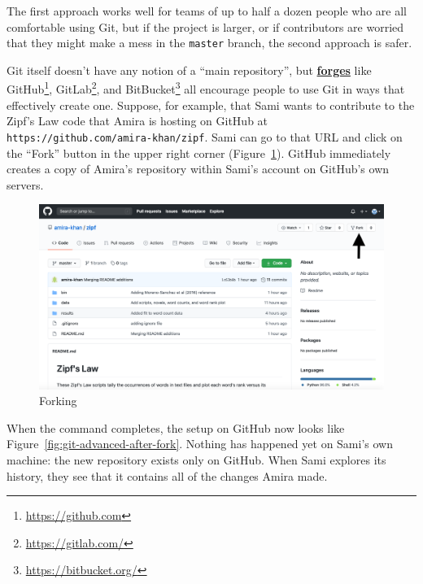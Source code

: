 \documentclass[
]{krantz}
\renewcommand{\href}[2]{#2\footnote{\url{#1}}}
\newcommand{\gref}[2]{\hyperlink{#2}{\textbf{#1}}}
\begin{document}
The first approach works well for teams of up to half a dozen people
who are all comfortable using Git,
but if the project is larger,
or if contributors are worried that they might make a mess in the \texttt{master} branch,
the second approach is safer.

Git itself doesn't have any notion of a ``main repository'',
but \gref{forges}{forge} like \href{https://github.com}{GitHub},
\href{https://gitlab.com/}{GitLab},
and \href{https://bitbucket.org/}{BitBucket} all encourage people
to use Git in ways that effectively create one.
Suppose,
for example,
that Sami wants to contribute to the Zipf's Law code that
Amira is hosting on GitHub at \texttt{https://github.com/amira-khan/zipf}.
Sami can go to that URL and click on the ``Fork'' button in the upper right corner
(Figure~\ref{fig:git-advanced-fork-button}).
GitHub immediately creates a copy of Amira's repository within Sami's account on GitHub's own servers.

\begin{figure}

{\centering \includegraphics[width=1\linewidth]{figures/git-advanced/fork-button} 

}

\caption{Forking}\label{fig:git-advanced-fork-button}
\end{figure}

When the command completes,
the setup on GitHub now looks like Figure~\ref{fig:git-advanced-after-fork}.
Nothing has happened yet on Sami's own machine:
the new repository exists only on GitHub.
When Sami explores its history,
they see that it contains all of the changes Amira made.
\end{document}
